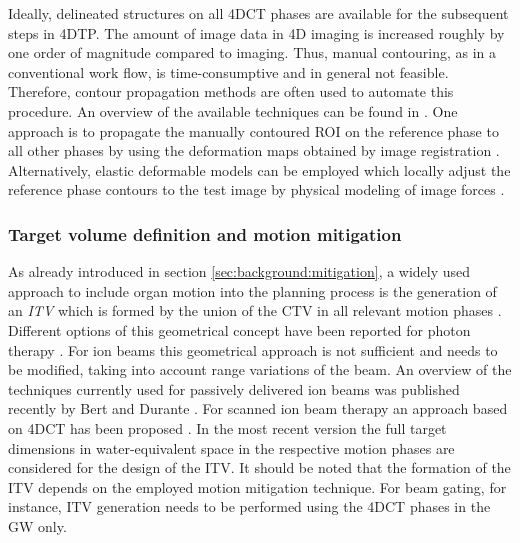 Ideally, delineated structures on all \ac{4DCT} phases are available
for the subsequent steps in \ac{4DTP}. The amount of image data in
\ac{4D} imaging is increased roughly by one order of magnitude
compared to \thrD imaging. Thus, manual contouring, as in a
conventional work flow, is time-consumptive and in general not
feasible. Therefore, contour propagation methods are often used to
automate this procedure.  An overview of the available techniques can
be found in \citep{Xing2007}. One approach is to propagate the
manually contoured \ac{ROI} on the reference phase to all other phases
by using the deformation maps obtained by image registration
\citep{Lu2006a}. Alternatively, elastic deformable models can be
employed which locally adjust the reference phase contours to the test
image by physical modeling of image forces \citep{McInerney1996}.

\subsubsection{Target volume definition and motion mitigation}
As already introduced in section \ref{sec:background:mitigation}, a
widely used approach to include organ motion into the planning process
is the generation of an \emph{\acf{ITV}} which is formed by the union
of the \ac{CTV} in all relevant motion phases
\citep{ICRU62}. Different options of this geometrical concept have
been reported for photon therapy
\citep{Rietzel2006b,Orban2007,Wolthaus2008}. For ion beams this
geometrical approach is not sufficient \citep{Moyers2001,ICRU78} and
needs to be modified, taking into account range variations of the
beam.  An overview of the techniques currently used for passively
delivered ion beams was published recently by Bert and Durante
\citep{Bert2011}. For scanned ion beam therapy an approach based on
\ac{4DCT} has been proposed \citep{Bert2007,Rietzel2010}. In the most
recent version the full target dimensions in water-equivalent space in
the respective motion phases are considered for the design of the
\ac{ITV}. It should be noted that the formation of the \ac{ITV}
depends on the employed motion mitigation technique. For beam gating,
for instance, \ac{ITV} generation needs to be performed using the
\ac{4DCT} phases in the \acl{GW} only.

